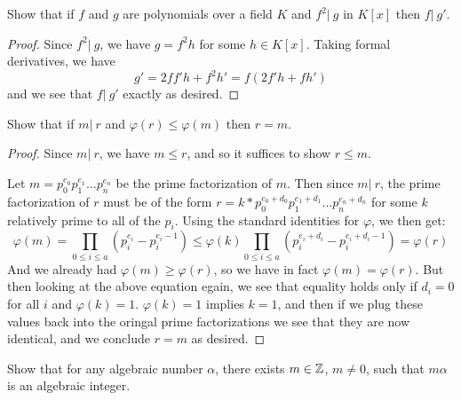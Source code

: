 \documentclass[11pt]{article}
\begin{document}
Show that if $f$ and $g$ are polynomials over a field $K$ and $f^2 |\ g$ in $K[x]$ then $f |\ g'$.

\begin{proof}
  Since $f^2 |\ g$, we have $g = f^2h$ for some $h \in K[x]$.
  Taking formal derivatives, we have $$g' = 2ff'h+f^2h' = f(2f'h+fh')$$ and we see that $f |\ g'$ exactly as desired.
\end{proof}


Show that if $m |\ r$ and $\varphi(r) \le \varphi(m)$ then $r = m$.

\begin{proof}
  Since $m |\ r$, we have $m \le r$, and so it suffices to show $r \le m$.

  Let $m = p_0^{e_0} p_1^{e_1} \dots p_n^{e_n}$ be the prime factorization of $m$.
  Then since $m |\ r$, the prime factorization of $r$ must be of the form $r = k * p_0^{e_0 + d_0} p_1^{e_1 + d_1} \dots p_n^{e_n + d_n}$ for some $k$ relatively prime to all of the $p_i$.
  Using the standard identities for $\varphi$, we then get:
  \begin{equation*}
    \varphi(m) = \prod_{0 \le i \le a} (p_i^{e_i} - p_i^{e_i - 1}) \le
    \varphi(k) \prod_{0 \le i \le a} (p_i^{e_i + d_i} - p_i^{e_i + d_i - 1})
    = \varphi(r)
  \end{equation*}
  And we already had $\varphi(m) \ge \varphi(r)$, so we have in fact $\varphi(m) = \varphi(r)$.
  But then looking at the above equation egain, we see that equality holds only if $d_i = 0$ for all $i$ and $\varphi(k) = 1$.
  $\varphi(k) = 1$ implies $k = 1$, and then if we plug these values back into the oringal prime factorizations we see that they are now identical, and we conclude $r = m$ as desired.
\end{proof}


Show that for any algebraic number $\alpha$, there exists $m \in \mathbb{Z}$, $m \ne 0$, such that $m\alpha$ is an algebraic integer.
\end{document}
